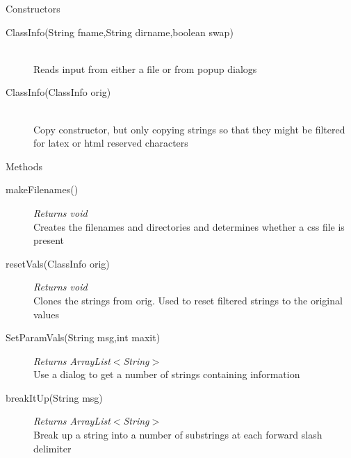 \documentclass[11pt,a4paper]{article}
\newenvironment{di}
{\begin{flushright}
\begin{minipage}{0.95\textwidth}
\begin{description}
}
{\end{description}
\end{minipage}
\end{flushright}
}
\begin{document}
\noindent\colorbox{conbg}{\parbox{1.0\textwidth}{\Large{Constructors}}}
\begin{di}
\item[{ClassInfo(String fname,String dirname,boolean swap)}]\qquad\\
Reads input from either a file or from popup dialogs
\item[{ClassInfo(ClassInfo orig)}]\qquad\\
Copy constructor, but only copying strings so that they might be filtered for latex or html reserved characters
\end{di}
\colorbox{descriptbg}{\parbox{1.0\textwidth}{\Large{Methods}}}
\begin{di}
\item[{makeFilenames()}]\emph{Returns void}\\
Creates the filenames and directories and determines whether a css file is present\\
\item[{resetVals(ClassInfo orig)}]\emph{Returns void}\\
Clones the strings from orig. Used to reset filtered strings to the original values\\
\item[{SetParamVals(String msg,int maxit)}]\emph{Returns ArrayList$<$String$>$}\\
Use a dialog to get a number of strings containing information\\
\item[{breakItUp(String msg)}]\emph{Returns ArrayList$<$String$>$}\\
Break up a string into a number of substrings at each forward slash delimiter\\
\end{di}
\end{document}
